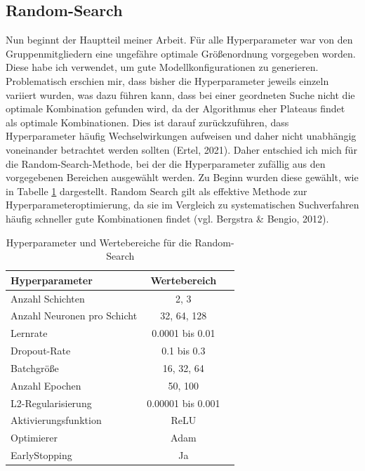 \documentclass[9pt,a4paper,twocolumn,twoside]{tau-class/tau}
\begin{document}
\subsection{Random-Search}
Nun beginnt der Hauptteil meiner Arbeit. Für alle Hyperparameter war von den Gruppenmitgliedern eine ungefähre optimale Größenordnung vorgegeben worden. Diese habe ich verwendet, um
gute Modellkonfigurationen zu generieren. Problematisch erschien mir, dass bisher die Hyperparameter jeweils einzeln variiert wurden, was dazu führen kann, dass bei einer geordneten Suche nicht die optimale Kombination gefunden wird, da der Algorithmus eher Plateaus findet als optimale Kombinationen.
Dies ist darauf zurückzuführen, dass Hyperparameter häufig Wechselwirkungen aufweisen und daher nicht unabhängig voneinander betrachtet werden sollten (Ertel, 2021).
Daher entschied ich mich für die Random-Search-Methode, bei der die Hyperparameter zufällig aus den vorgegebenen Bereichen ausgewählt werden. Zu Beginn wurden diese gewählt, wie in Tabelle \ref{tab:hyperparameters} dargestellt.
Random Search gilt als effektive Methode zur Hyperparameteroptimierung, da sie im Vergleich zu systematischen Suchverfahren häufig schneller gute Kombinationen findet (vgl. Bergstra \& Bengio, 2012).
\begin{table}[ht]
    \centering
    \begin{tabular}{@{}lcc@{}}
        \toprule
        Hyperparameter & Wertebereich
        \\ \midrule
        Anzahl Schichten & 2, 3 \\
        Anzahl Neuronen pro Schicht & 32, 64, 128 \\
        Lernrate & 0.0001 bis 0.01 \\
        Dropout-Rate & 0.1 bis 0.3 \\
        Batchgröße & 16, 32, 64 \\
        Anzahl Epochen & 50, 100 \\
        L2-Regularisierung & 0.00001 bis 0.001 \\
        Aktivierungsfunktion & ReLU \\
        Optimierer & Adam \\
        EarlyStopping & Ja \\
        \bottomrule
    \end{tabular}
    \\
    \caption{Hyperparameter und Wertebereiche für die Random-Search}
    \label{tab:hyperparameters}
\end{table}
\\
\end{document}
